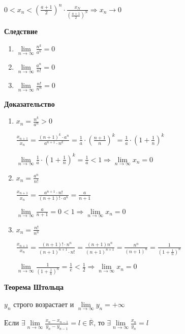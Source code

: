 \documentclass[14pt, letter paper]{article}
\begin{document}
$0 < x_n < (\frac{a+1}{2})^n \cdot \frac{x_N}{(\frac{a+1}{2})^N} \Rightarrow x_n \rightarrow 0$

\textbf{Следствие}

\begin{enumerate}
    \item $\lim\limits_{n \rightarrow \infty}{\frac{n^k}{a^n}} = 0$
    \item $\lim\limits_{n \rightarrow \infty}{\frac{a^n}{n!}} = 0$
    \item $\lim\limits_{n \rightarrow \infty}{\frac{n!}{n^n}} = 0$
\end{enumerate}

\begin{center}
    \textbf{Доказательство}
\end{center}

\begin{enumerate}
    \item $x_n = \frac{n^k}{a^n} > 0$

    $\frac{x_{n+1}}{x_n} = \frac{(n+1)^k \cdot a^n}{a^{n+1} \cdot n^k} = \frac{1}{a} \cdot (\frac{n+1}{n})^k = \frac{1}{a} \cdot (1 + \frac{1}{n})^k$

    $\lim\limits_{n \rightarrow \infty}{\frac{1}{a} \cdot(1 + \frac{1}{n})^k} = \frac{1}{a} < 1 \Rightarrow \lim\limits_{n \rightarrow \infty}{x_n} = 0$

    \item $x_n = \frac{a^n}{n!}$

    $\frac{x_{n+1}}{x_n} = \frac{a^{n+1} \cdot n!}{(n+1)! \cdot a^n} = \frac{a}{n+1}$

    $\lim\limits_{n \rightarrow \infty}{\frac{a}{n+1}} = 0 < 1 \Rightarrow \lim\limits_{n \rightarrow \infty}{x_n} = 0$

    \item $x_n = \frac{n!}{n^n}$

    $\frac{x_{n+1}}{x_n} = \frac{(n+1)! \cdot n^n}{(n+1)^{n+1} \cdot n!} = \frac{(n+1)n^n}{(n+1)^{n+1}} = \frac{n^n}{(n+1)^n} = \frac{1}{(1 + \frac{1}{n})^n}$

    $\lim\limits_{n \rightarrow \infty}{\frac{1}{(1 + \frac{1}{n})^n}} = \frac{1}{e} < \frac{1}{2} \Rightarrow \lim\limits_{n \rightarrow \infty}{x_n} = 0$
\end{enumerate}

\textbf{Теорема Штольца}

$y_n$ строго возрастает и $\lim\limits_{n \rightarrow \infty}{y_n} = + \infty$

Если $\exists \lim\limits_{n \rightarrow \infty}{\frac{x_n - x_{n-1}}{y_n - y_{n-1}}} = l \in \overline{\mathds{R}}$, то $\exists \lim\limits_{n \rightarrow \infty}{\frac{x_n}{y_n}} = l$
\end{document}
